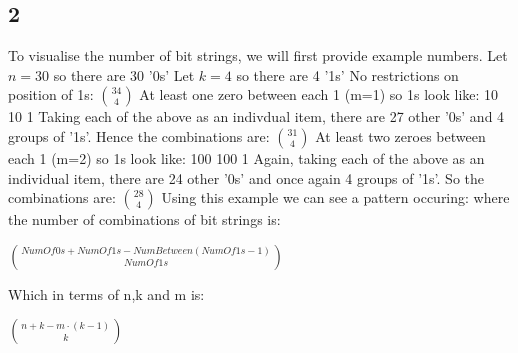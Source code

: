\documentclass{article}
\begin{document}
	\subsection*{2}
	To visualise the number of bit strings, we  will first provide example numbers.
	\newline
	Let $ n=30$ so there are 30 '0s'
	\newline
	Let $ k=4$ so there are 4 '1s'
	\newline
	No restrictions on position of 1s: $\binom{34}{4}$
	\newline
	At least one zero between each 1 (m=1) so 1s look like:
	 10 10 1 
	\newline
	Taking each of the above as an indivdual item, there are 27 other '0s'  and 4 groups of '1s'. Hence the combinations are: $\binom{31}{4}$
	\newline
	At least two zeroes between each 1 (m=2) so 1s look like:
	 100 100 1
	\newline
	Again, taking each of the above as an individual item, there are 24 other '0s' and once again 4 groups of '1s'. So the combinations are: $\binom{28}{4}$
	\newline
	\newline
	Using this example we can see a pattern occuring: where the number of combinations of bit strings is:
	\newline
	\begin{center}
	$\binom{NumOf0s + NumOf1s - NumBetween(NumOf1s -1)}{NumOf1s}$
	\end{center}
	Which in terms of n,k and m is:
	\newline
	\begin{center}
	$\binom{n+k-m\cdot(k-1)}{k}$
	\end{center}
\end{document}
